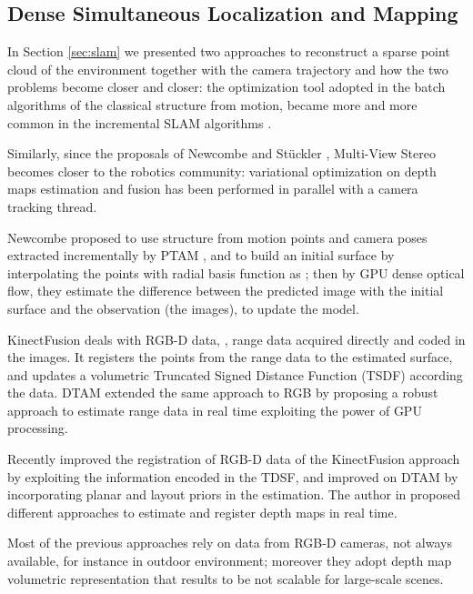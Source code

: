 \subsection{Dense Simultaneous Localization and Mapping}
In Section \ref{sec:slam} we presented two approaches to reconstruct a sparse point cloud of the environment together with the camera trajectory and how the two problems become closer and closer: the optimization tool adopted in the batch algorithms of the classical structure from motion, became more and more common in the incremental SLAM algorithms \cite{mouragnon_et_al07,strasdat11}.

Similarly, since the proposals of Newcombe \etal \cite{newcombe2010live,newcombe2011kinectfusion,newcombe2011dtam} and St{\"u}ckler \etal \cite{stuhmer2010real}, Multi-View Stereo becomes closer to the robotics community: variational optimization on depth maps estimation and fusion has been performed in parallel with a camera tracking thread.

Newcombe \etal \cite{newcombe2010live} proposed to use structure from motion points and camera poses extracted incrementally by PTAM \cite{klein_murray07}, and to build an initial surface by interpolating the points with radial basis function as \cite{ohtake2003multi}; then by GPU dense optical flow, they estimate the difference between the predicted image with the initial surface and the observation (the images), to update the model.

KinectFusion \cite{newcombe2011kinectfusion} deals with RGB-D data, \ie, range data acquired  directly and coded in the images. It registers the points from the range data to the estimated surface, and updates  a volumetric Truncated Signed Distance Function (TSDF) according the data. DTAM \cite{newcombe2011dtam} extended the same approach to RGB by proposing a robust approach to estimate range data in real time exploiting the power of GPU processing.

Recently \cite{bylow2013real} improved the registration of RGB-D data of the KinectFusion approach by exploiting the information encoded in the TDSF, and \cite{concha2015incorporating} improved on DTAM by incorporating planar and layout priors in the estimation. The author in \cite{stuhmer2012parallel,stuckler2014multi} proposed different approaches to estimate and register depth maps in real time.

Most of the previous approaches rely on data from RGB-D cameras, not always available, for instance in outdoor environment; moreover they adopt depth map  volumetric representation that results to be not scalable for large-scale scenes.  

